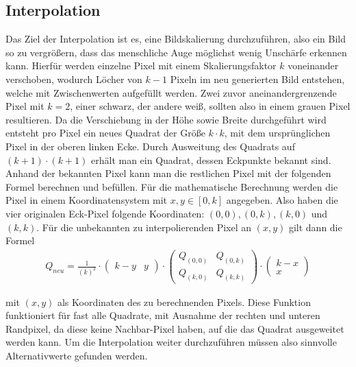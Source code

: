 \documentclass[course=erap]{aspdoc}
\begin{document}
\subsection{Interpolation}
Das Ziel der Interpolation ist es, eine Bildskalierung durchzuführen, also ein Bild so zu vergrößern, dass das menschliche Auge möglichst wenig Unschärfe erkennen kann. Hierfür werden einzelne Pixel mit einem Skalierungsfaktor $k$ voneinander verschoben, wodurch Löcher von $k-1$ Pixeln im neu generierten Bild entstehen, welche mit Zwischenwerten aufgefüllt werden. Zwei zuvor aneinandergrenzende Pixel mit $k = 2$, einer schwarz, der andere weiß, sollten also in einem grauen Pixel resultieren. Da die Verschiebung in der Höhe sowie Breite durchgeführt wird entsteht pro Pixel ein neues Quadrat der Größe $k \cdot k$, mit dem ursprünglichen Pixel in der oberen linken Ecke. Durch Ausweitung des Quadrats auf $(k+1) \cdot (k+1)$ erhält man
ein Quadrat, dessen Eckpunkte bekannt sind. Anhand der bekannten Pixel kann man die restlichen Pixel mit der folgenden Formel berechnen und befüllen. Für die mathematische Berechnung werden die Pixel in einem Koordinatensystem mit $x, y \in [0, k]$ angegeben. Also haben die vier originalen Eck-Pixel folgende Koordinaten: $(0, 0), (0, k), (k, 0)$ und $(k, k)$. Für die unbekannten zu interpolierenden Pixel an $(x, y)$ gilt dann die Formel
 \begin{align}
    Q_{neu} {=}  \frac{1}{(k)^2} \cdot
    \begin{pmatrix} k-y & y \end{pmatrix} \cdot
    \begin{pmatrix} Q_{(0,0)} & Q_{(0,k)} \\ Q_{(k,0)} & Q_{(k,k)} \end{pmatrix}
    \cdot
     \begin{pmatrix} k-x \\ x \end{pmatrix} 
\end{align}

 
mit $(x, y)$ als Koordinaten des zu berechnenden Pixels. Diese Funktion funktioniert für fast alle Quadrate, mit Ausnahme der rechten und unteren Randpixel, da diese keine Nachbar-Pixel haben, auf die das Quadrat ausgeweitet werden kann. Um die Interpolation weiter durchzuführen müssen also sinnvolle Alternativwerte gefunden werden.
\end{document}
